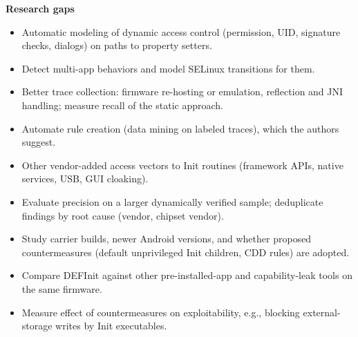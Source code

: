 \documentclass[11pt,a4paper]{article}
\begin{document}
\begin{enumerate}
    \vspace{4pt}
    \textbf{Research gaps}
    \begin{itemize}[leftmargin=*, itemsep=1pt, topsep=2pt]
        \item Automatic modeling of dynamic access control (permission, UID, signature checks, dialogs) on paths to property setters.
        \item Detect multi-app behaviors and model SELinux transitions for them.
        \item Better trace collection: firmware re-hosting or emulation, reflection and JNI handling; measure recall of the static approach.
        \item Automate rule creation (data mining on labeled traces), which the authors suggest.
        \item Other vendor-added access vectors to Init routines (framework APIs, native services, USB, GUI cloaking).
        \item Evaluate precision on a larger dynamically verified sample; deduplicate findings by root cause (vendor, chipset vendor).
        \item Study carrier builds, newer Android versions, and whether proposed countermeasures (default unprivileged Init children, CDD rules) are adopted.
        \item Compare DEFInit against other pre-installed-app and capability-leak tools on the same firmware.
        \item Measure effect of countermeasures on exploitability, e.g., blocking external-storage writes by Init executables.
    \end{itemize}

\end{enumerate}
\end{document}
